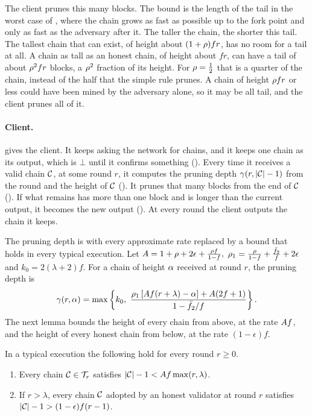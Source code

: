 The client prunes this many blocks. The bound is the length of the tail in the
worst case of , where the chain grows as fast as possible up
to the fork point and only as fast as the adversary after it. The taller the
chain, the shorter this tail. The tallest chain that can exist, of height about
$(1+\rho)fr$, has no room for a tail at all. A chain as tall as an honest
chain, of height about $fr$, can have a tail of about $\rho^2fr$ blocks, a
$\rho^2$ fraction of its height. For $\rho=\frac{1}{2}$ that is a quarter of
the chain, instead of the half that the simple rule prunes. A chain of height
$\rho fr$ or less could have been mined by the adversary alone, so it may be
all tail, and the client prunes all of it.

\paragraph{Client.}

 gives the client. It keeps asking the network for chains,
and it keeps one chain as its output, which is $\bot$ until it confirms
something (). Every time it receives a valid chain $\mathcal{C}$, at
some round $r$, it computes the pruning depth $\gamma(r,\lvert \mathcal{C}\rvert-1)$ from the round
and the height of $\mathcal{C}$ (). It prunes that many blocks from
the end of $\mathcal{C}$ (). If what remains has more than one block
and is longer than the current output, it becomes the new output
(). At every round the client outputs the chain it
keeps.

The pruning depth is  with every approximate rate replaced
by a bound that holds in every typical execution. Let
\(
    A = 1+\rho+2\epsilon+\frac{\rho f}{1-f},
\)
\(
    \rho_1 = \frac{\rho}{1-f}+\frac{\bar{f}_2}{f}+2\epsilon
\)
and
\(
    k_0 = 2(\lambda+2)f .
\)
For a chain of height $\alpha$ received at round $r$, the pruning depth is
\begin{equation}\label{eq.depth}
    \gamma(r,\alpha)
    = \max\left\{k_0,\
    \frac{\rho_1\left[A f(r+\lambda)-\alpha\right]+A(2f+1)}{1-\bar{f}_2/f}\right\}.
\end{equation}
The next lemma bounds the height of every chain from above, at the rate $A f$,
and the height of every honest chain from below, at the rate $(1-\epsilon)f$.

\begin{lemma}\label{lem.length}
    In a typical execution the following hold for every round $r\ge0$.
    \begin{enumerate}
        \item Every chain $\mathcal{C}\in\mathcal{T}_r$ satisfies
            $\lvert \mathcal{C}\rvert-1<A f\max(r,\lambda)$.
        \item If $r>\lambda$, every chain $\mathcal{C}$ adopted by an honest validator
            at round $r$ satisfies $\lvert \mathcal{C}\rvert-1>(1-\epsilon)f(r-1)$.
    \end{enumerate}
\end{lemma}

